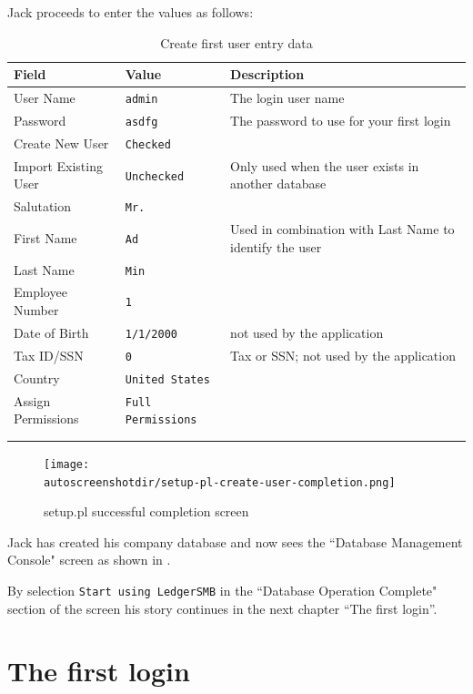 Jack proceeds to enter the values as follows:
\begin{longtable}{ llp{6cm} }
        Field & Value & Description \\ \hline
        \endhead
        User Name & \texttt{admin} & The login user name\\
        Password & \texttt{asdfg} & The password to use for your first login\\
        Create New User & \texttt{Checked} & \\
        Import Existing User & \texttt{Unchecked} & Only used when the user exists in another database\\
        Salutation & \texttt{Mr.} & \\
        First Name &  \texttt{Ad} & Used in combination with Last Name to identify the user \\
        Last Name & \texttt{Min} & \\
        Employee Number & \texttt{1} & \\
        Date of Birth & \texttt{1/1/2000} & not used by the application \\
        Tax ID/SSN & \texttt{0} & Tax or \acrshort{SSN}; not used by the application \\
        Country & \texttt{United States} & \\
        Assign Permissions & \texttt{Full Permissions} & \\
        \\
        \caption{Create first user entry data}
        \label{tbl:setupp-step5-user-entry-data}
\end{longtable}

\begin{figure}[ht]
\centering
\texttt{[image: \\autoscreenshotdir/setup-pl-create-user-completion.png]}
\caption{setup.pl successful completion screen}
\label{fig:setup-step6}
\end{figure}

Jack has created his company database and now sees the
 ``Database Management Console"  screen as shown in .

By selection \texttt{Start using LedgerSMB} in the ``Database Operation Complete" section of the screen his story continues in
the next chapter ``The first login''.

\chapter{The first login}
\label{cha-first-login}

